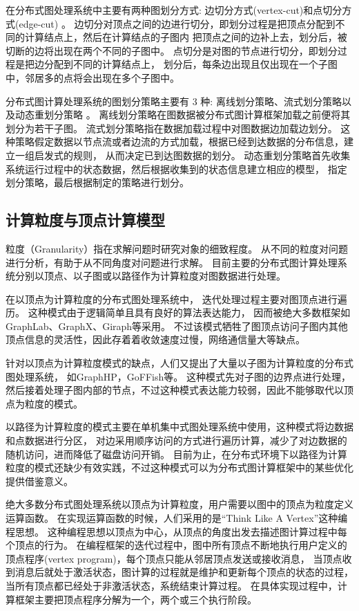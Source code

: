 在分布式图处理系统中主要有两种图划分方式:
边切分方式(vertex-cut)\cite{Gonzalez@OSDI12}和点切分方式(edge-cut) \cite{Malewicz@SIGMOD10}。
边切分对顶点之间的边进行切分，即划分过程是把顶点分配到不同的计算结点上，然后在计算结点的子图内
把顶点之间的边补上去，划分后，被切断的边将出现在两个不同的子图中。
点切分是对图的节点进行切分，即划分过程是把边分配到不同的计算结点上，
划分后，每条边出现且仅出现在一个子图中，邻居多的点将会出现在多个子图中。

分布式图计算处理系统的图划分策略主要有 3 种: 
离线划分策略\cite{metis}、流式划分策略\cite{tsourakakis2014fennel}以及动态重划分策略\cite{kumar2017graphsteal} 。
离线划分策略在图数据被分布式图计算框架加载之前便将其划分为若干子图。
流式划分策略指在数据加载过程中对图数据边加载边划分。
这种策略假定数据以节点流或者边流的方式加载，根据已经到达数据的分布信息，建立一组启发式的规则，
从而决定已到达图数据的划分。
动态重划分策略首先收集系统运行过程中的状态数据，然后根据收集到的状态信息建立相应的模型，
指定划分策略，最后根据制定的策略进行划分。

\subsection{计算粒度与顶点计算模型}

粒度（Granularity）指在求解问题时研究对象的细致程度。
从不同的粒度对问题进行分析，有助于从不同角度对问题进行求解。
目前主要的分布式图计算处理系统分别以顶点、以子图或以路径作为计算粒度对图数据进行处理。
    
在以顶点为计算粒度的分布式图处理系统中，
迭代处理过程主要对图顶点进行遍历。
这种模式由于逻辑简单且具有良好的算法表达能力，
因而被绝大多数框架如GraphLab\cite{Low@12}、GraphX\cite{Gonzalez@OSDI14}、Giraph\cite{Avery@HS11}等采用。
不过该模式牺牲了图顶点访问子图内其他顶点信息的灵活性，因此存着着收敛速度过慢，网络通信量大等缺点。

针对以顶点为计算粒度模式的缺点，人们又提出了大量以子图为计算粒度的分布式图处理系统，
如GraphHP\cite{su2016graphhp}，GoFFish\cite{goffish}等。
这种模式先对子图的边界点进行处理，然后接着处理子图内部的节点，不过这种模式表达能力较弱，因此不能够取代以顶点为粒度的模式。

以路径为计算粒度的模式主要在单机集中式图处理系统中使用，这种模式将边数据和点数据进行分区，
对边采用顺序访问的方式进行遍历计算，减少了对边数据的随机访问，进而降低了磁盘访问开销。
目前为止，在分布式环境下以路径为计算粒度的模式还缺少有效实践，不过这种模式可以为分布式图计算框架中的某些优化提供借鉴意义。

绝大多数分布式图处理系统以顶点为计算粒度，用户需要以图中的顶点为粒度定义运算函数。
在实现运算函数的时候，人们采用的是“Think Like A Vertex”\cite{TLV}这种编程思想。
这种编程思想以顶点为中心，从顶点的角度出发去描述图计算过程中每个顶点的行为。
在编程框架的迭代过程中，图中所有顶点不断地执行用户定义的顶点程序(vertex program)，每个顶点只能从邻居顶点发送或接收消息，
当顶点收到消息后就处于激活状态，图计算的过程就是维护和更新每个顶点的状态的过程，当所有顶点都已经处于非激活状态，系统结束计算过程。
在具体实现过程中，计算框架主要把顶点程序分解为一个，两个或三个执行阶段。


